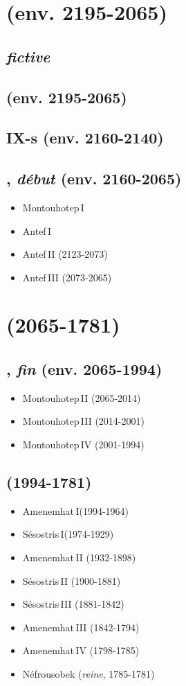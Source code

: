 \section*{\PPI (env. 2195-2065)}

\subsection*{ \emph{fictive}}
\subsection*{ (env. 2195-2065)}
\subsection*{IX\ieme-s (env. 2160-2140)}
\subsection*{, \emph{début} (env. 2160-2065)}
  \begin{itemize}
    \item Montouhotep\,I\ier
    \item Antef\,I\ier
    \item Antef\,II (2123-2073)
    \item Antef\,III (2073-2065)
  \end{itemize}

\section*{\MK (2065-1781)}

\subsection*{, \emph{fin} (env. 2065-1994)}
  \begin{itemize}
    \item Montouhotep\,II (2065-2014)
    \item Montouhotep\,III (2014-2001)
    \item Montouhotep\,IV (2001-1994)
  \end{itemize}
\subsection*{ (1994-1781)}
  \begin{itemize}
    \item Amenemhat\,I\ier (1994-1964)
    \item Sésostris\,I\ier (1974-1929)
    \item Amenemhat\,II (1932-1898)
    \item Sésostris\,II (1900-1881)
    \item Sésostris\,III (1881-1842)
    \item Amenemhat\,III (1842-1794)
    \item Amenemhat\,IV (1798-1785)
    \item Néfrousobek (\emph{reine}, 1785-1781)
  \end{itemize}


